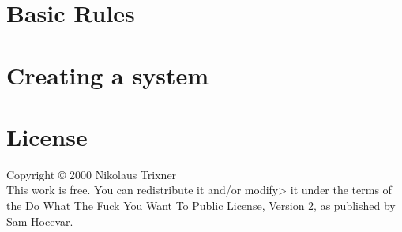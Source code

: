 \documentclass{article}
\begin{document}
\part{Basic Rules}\label{part:basicRules}
	

\part{Creating a system}\label{part:systemCreation}
	


\part{License}\label{part:license}
	Copyright © 2000 Nikolaus Trixner\\
	This work is free.
	You can redistribute it and/or modify> it under the  terms of the Do What The Fuck You Want To Public License, Version 2, as published by Sam Hocevar.
\end{document}
